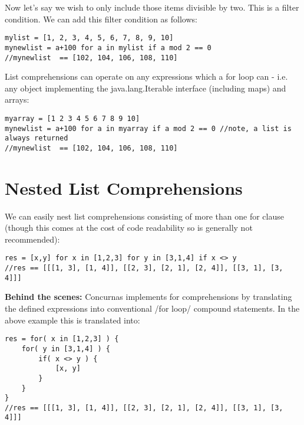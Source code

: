 \documentclass[conc-doc]{subfiles}
\begin{document}
Now let’s say we wish to only include those items divisible by two. This is a filter condition. We can add this filter condition as follows:
\begin{lstlisting}
mylist = [1, 2, 3, 4, 5, 6, 7, 8, 9, 10]
mynewlist = a+100 for a in mylist if a mod 2 == 0
//mynewlist  == [102, 104, 106, 108, 110]
\end{lstlisting}

List comprehensions can operate on any expressions which a for loop can - i.e. any object implementing the java.lang.Iterable interface (including maps) and arrays:
\begin{lstlisting}
myarray = [1 2 3 4 5 6 7 8 9 10]
mynewlist = a+100 for a in myarray if a mod 2 == 0 //note, a list is always returned
//mynewlist  == [102, 104, 106, 108, 110]
\end{lstlisting}

\section{Nested List Comprehensions}
We can easily nest list comprehensions consisting of more than one for clause (though this comes at the cost of code readability so is generally not recommended):
\begin{lstlisting}
res = [x,y] for x in [1,2,3] for y in [3,1,4] if x <> y
//res == [[[1, 3], [1, 4]], [[2, 3], [2, 1], [2, 4]], [[3, 1], [3, 4]]]
\end{lstlisting}

\textbf{Behind the scenes:} Concurnas implements for comprehensions by translating the defined expressions into  conventional /for loop/ compound statements. In the above example this is translated into:
\begin{lstlisting}
res = for( x in [1,2,3] ) {
	for( y in [3,1,4] ) {
		if( x <> y ) {	
			[x, y]
		}
	}
}
//res == [[[1, 3], [1, 4]], [[2, 3], [2, 1], [2, 4]], [[3, 1], [3, 4]]]
\end{lstlisting}
\end{document}

